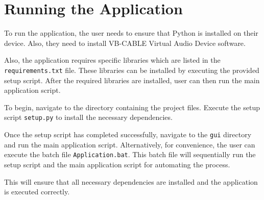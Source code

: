 \section{Running the Application}

To run the application, the user needs to ensure that Python is installed on their device. Also, they need to install VB-CABLE Virtual Audio Device software.

Also, the application requires specific libraries which are listed in the \texttt{requirements.txt} file. These libraries can be installed by executing the provided setup script. After the required libraries are installed, user can then run the main application script.

To begin, navigate to the directory containing the project files. Execute the setup script \texttt{setup.py} to install the necessary dependencies.

Once the setup script has completed successfully, navigate to the \texttt{gui} directory and run the main application script. Alternatively, for convenience, the user can execute the batch file \texttt{Application.bat}. This batch file will sequentially run the setup script and the main application script for automating the process. 

This will ensure that all necessary dependencies are installed and the application is executed correctly.
